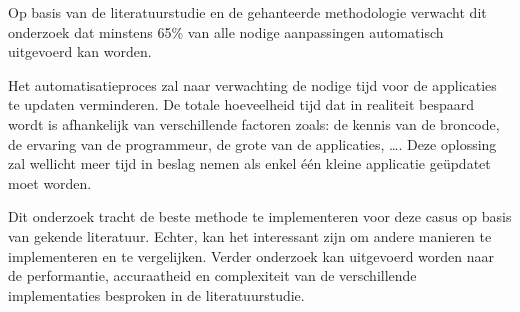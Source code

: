 Op basis van de literatuurstudie en de gehanteerde methodologie verwacht dit onderzoek dat minstens 65\% van alle nodige aanpassingen automatisch uitgevoerd kan worden.

Het automatisatieproces zal naar verwachting de nodige tijd voor de applicaties te updaten verminderen.
De totale hoeveelheid tijd dat in realiteit bespaard wordt is afhankelijk van verschillende factoren zoals: de kennis van de broncode, de ervaring van de programmeur, de grote van de applicaties, \dots.
Deze oplossing zal wellicht meer tijd in beslag nemen als enkel één kleine applicatie geüpdatet moet worden.

Dit onderzoek tracht de beste methode te implementeren voor deze casus op basis van gekende literatuur.
Echter, kan het interessant zijn om andere manieren te implementeren en te vergelijken.
Verder onderzoek kan uitgevoerd worden naar de performantie, accuraatheid en complexiteit van de verschillende implementaties besproken in de literatuurstudie.

